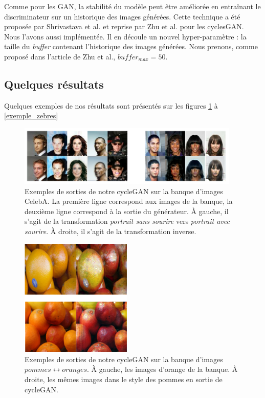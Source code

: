 Comme pour les GAN, la stabilité du modèle peut être améliorée en entraînant le discriminateur sur un historique des images générées. Cette technique a été proposée par Shrivastava  et  al. \cite{shrivastava_learning_2016} et reprise par Zhu et al. pour les cyclesGAN. Nous l'avons aussi implémentée. Il en découle un nouvel hyper-paramètre : la taille du \textit{buffer} contenant l'historique des images générées. Nous prenons, comme proposé dans l'article de Zhu et al., $buffer_{max} = 50$.

\subsection{Quelques résultats}

Quelques exemples de nos résultats sont présentés sur les figures \ref{exemple_celebA} à \ref{exemple_zebres}

\begin{figure}[!h]
\centering
\includegraphics[width=300pt]{"images/cycle"}
\caption{Exemples de sorties de notre cycleGAN sur la banque d'images CelebA. La première ligne correspond aux images de la banque, la deuxième ligne correspond à la sortie du générateur. À gauche, il s'agit de la transformation \textit{portrait sans sourire} vers \textit{portrait avec sourire}. À droite, il s'agit de la transformation inverse.}
\label{exemple_celebA}
\end{figure}

\begin{figure}[!h]
\centering
\includegraphics[width=150pt]{"images/cycleRes2"}
\caption{Exemples de sorties de notre cycleGAN sur la banque d'images $pommes \leftrightarrow oranges$. À gauche, les images d'orange de la banque. À droite, les mêmes images dans le style des pommes en sortie de cycleGAN.}
\label{exemple_orange}
\end{figure}

